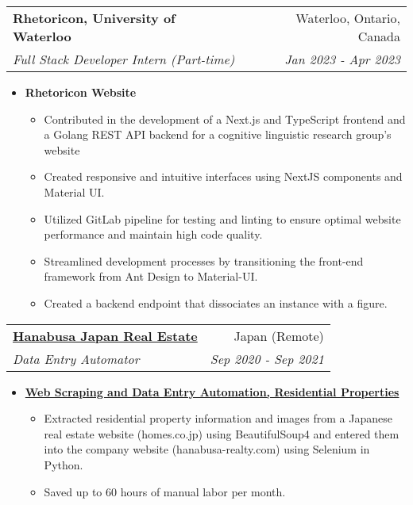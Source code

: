 \documentclass[letterpaper,11pt]{article}
\makeatletter
\newcommand{\resumeItem}[2]{
  \item\small{
    \textbf{#1}{ #2 \vspace{3pt}}
  }
}
\newcommand{\resumeSubheading}[4]{
  \vspace{-1pt}\item
    \begin{tabular*}{0.97\textwidth}{l@{\extracolsep{\fill}}r}
      \textbf{#1} & #2 \\
      \textit{\small#3} & \textit{\small #4} \\
    \end{tabular*}\vspace{0pt}
}
\newcommand{\resumeItemListStart}{\begin{itemize}}
\newcommand{\resumeItemListEnd}{\end{itemize}\vspace{0pt}}
\makeatother
\begin{document}
\resumeSubheading
{Rhetoricon, University of Waterloo}{Waterloo, Ontario, Canada}
{Full Stack Developer Intern (Part-time)}{Jan 2023 - Apr 2023}
\resumeItemListStart
\resumeItem{Rhetoricon Website}
{\begin{itemize}
		\item Contributed in the development of a Next.js and TypeScript frontend and a Golang REST API backend for a cognitive linguistic research group's website
		\item Created responsive and intuitive interfaces using NextJS components and Material UI.
		\item Utilized GitLab pipeline for testing and linting to ensure optimal website performance and maintain high code quality.
		\item Streamlined development processes by transitioning the front-end framework from Ant Design to Material-UI.
		\item Created a backend endpoint that dissociates an instance with a figure.


	\end{itemize}}
\resumeItemListEnd

\resumeSubheading
{\href{https://hanabusa-realty.com/}{Hanabusa Japan Real Estate}}{Japan (Remote)}
{Data Entry Automator}{Sep 2020 - Sep 2021}
\resumeItemListStart
\resumeItem{\href{https://github.com/pl3lee/Hanabusa-Automation}{Web Scraping and Data Entry Automation, Residential Properties}}
{\begin{itemize}
		\item Extracted residential property information and images from a Japanese real estate website (homes.co.jp) using BeautifulSoup4 and entered them into the company website (hanabusa-realty.com) using Selenium in Python.
		\item Saved up to 60 hours of manual labor per month.
	\end{itemize}}
\resumeItemListEnd
\end{document}
